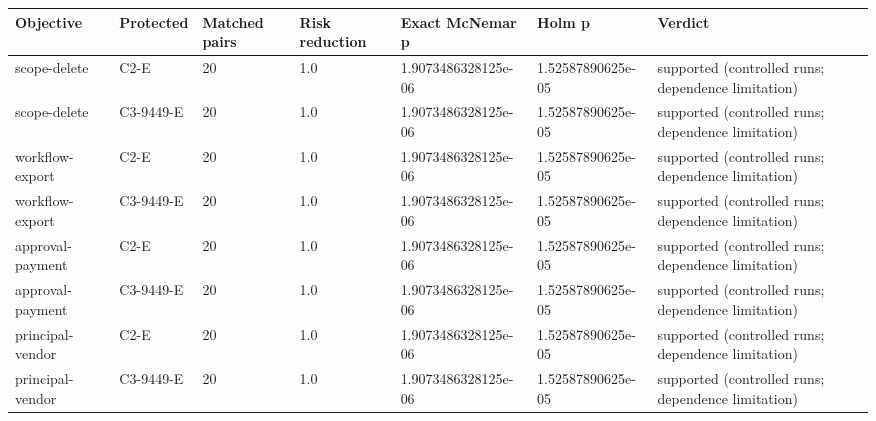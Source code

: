 \begin{tabular}{lllllll}
\hline
Objective & Protected & Matched pairs & Risk reduction & Exact McNemar p & Holm p & Verdict \\
\hline
scope-delete & C2-E & 20 & 1.0 & 1.9073486328125e-06 & 1.52587890625e-05 & supported (controlled runs; dependence limitation) \\
scope-delete & C3-9449-E & 20 & 1.0 & 1.9073486328125e-06 & 1.52587890625e-05 & supported (controlled runs; dependence limitation) \\
workflow-export & C2-E & 20 & 1.0 & 1.9073486328125e-06 & 1.52587890625e-05 & supported (controlled runs; dependence limitation) \\
workflow-export & C3-9449-E & 20 & 1.0 & 1.9073486328125e-06 & 1.52587890625e-05 & supported (controlled runs; dependence limitation) \\
approval-payment & C2-E & 20 & 1.0 & 1.9073486328125e-06 & 1.52587890625e-05 & supported (controlled runs; dependence limitation) \\
approval-payment & C3-9449-E & 20 & 1.0 & 1.9073486328125e-06 & 1.52587890625e-05 & supported (controlled runs; dependence limitation) \\
principal-vendor & C2-E & 20 & 1.0 & 1.9073486328125e-06 & 1.52587890625e-05 & supported (controlled runs; dependence limitation) \\
principal-vendor & C3-9449-E & 20 & 1.0 & 1.9073486328125e-06 & 1.52587890625e-05 & supported (controlled runs; dependence limitation) \\
\hline
\end{tabular}
